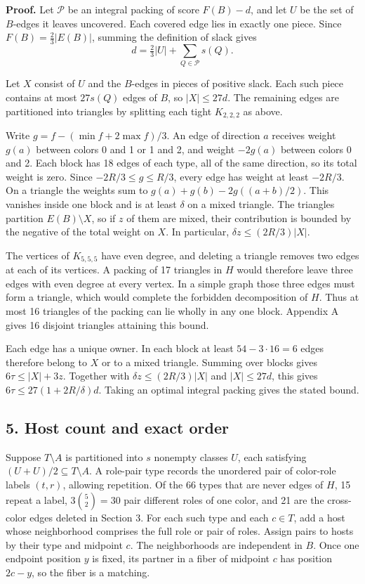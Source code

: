 \documentclass[english,11pt,a4paper]{article}
\newcounter{none}
\begin{document}
\textbf{Proof.} Let \(\mathcal P\) be an integral packing of score \(F(B)-d\), and let \(U\) be the set of \(B\)-edges it leaves uncovered. Each covered edge lies in exactly one piece. Since \(F(B)=\tfrac23|E(B)|\), summing the definition of slack gives
\[d=\tfrac23|U|+\sum_{Q\in\mathcal P}s(Q).\]

Let \(X\) consist of \(U\) and the \(B\)-edges in pieces of positive slack. Each such piece contains at most \(27s(Q)\) edges of \(B\), so \(|X|\le27d\). The remaining edges are partitioned into triangles by splitting each tight \(K_{2,2,2}\) as above.

Write \(g=f-(\min f+2\max f)/3\). An edge of direction \(a\) receives weight \(g(a)\) between colors 0 and 1 or 1 and 2, and weight \(-2g(a)\) between colors 0 and 2. Each block has 18 edges of each type, all of the same direction, so its total weight is zero. Since \(-2R/3\le g\le R/3\), every edge has weight at least \(-2R/3\). On a triangle the weights sum to \(g(a)+g(b)-2g((a+b)/2)\). This vanishes inside one block and is at least \(\delta\) on a mixed triangle. The triangles partition \(E(B)\setminus X\), so if \(z\) of them are mixed, their contribution is bounded by the negative of the total weight on \(X\). In particular, \(\delta z\le(2R/3)|X|\).

The vertices of \(K_{5,5,5}\) have even degree, and deleting a triangle removes two edges at each of its vertices. A packing of 17 triangles in \(H\) would therefore leave three edges with even degree at every vertex. In a simple graph those three edges must form a triangle, which would complete the forbidden decomposition of \(H\). Thus at most 16 triangles of the packing can lie wholly in any one block. Appendix A gives 16 disjoint triangles attaining this bound.

Each edge has a unique owner. In each block at least \(54-3\cdot16=6\) edges therefore belong to \(X\) or to a mixed triangle. Summing over blocks gives \(6\tau\le |X|+3z\). Together with \(\delta z\le (2R/3)|X|\) and \(|X|\le27d\), this gives \(6\tau\le27(1+2R/\delta)d\). Taking an optimal integral packing gives the stated bound.

\subsection{5. Host count and exact order}\label{host-count-and-exact-order}

Suppose \(T\setminus A\) is partitioned into \(s\) nonempty classes \(U\), each satisfying \((U+U)/2\subseteq T\setminus A\). A role-pair type records the unordered pair of color-role labels \((t,r)\), allowing repetition. Of the 66 types that are never edges of \(H\), 15 repeat a label, \(3\binom52=30\) pair different roles of one color, and 21 are the cross-color edges deleted in Section 3. For each such type and each \(c\in T\), add a host whose neighborhood comprises the full role or pair of roles. Assign pairs to hosts by their type and midpoint \(c\). The neighborhoods are independent in \(B\). Once one endpoint position \(y\) is fixed, its partner in a fiber of midpoint \(c\) has position \(2c-y\), so the fiber is a matching.
\end{document}
